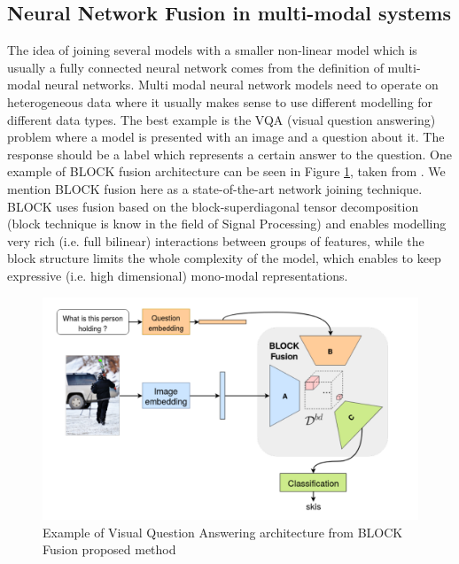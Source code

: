 \documentclass[b5paper]{book}
\let\cite\parencite
\begin{document}
\subsection{Neural Network Fusion in multi-modal systems}


The idea of joining several models with a smaller non-linear model which is usually a fully connected neural network comes from the definition of multi-modal neural networks. Multi modal neural network models need to operate on heterogeneous data where it usually makes sense to use different modelling for different data types. The best example is the VQA (visual question answering) problem where a model is presented with an image and a question about it. The response should be a label which represents a certain answer to the question. One example of BLOCK \cite{ben2019block} fusion architecture can be seen in Figure \ref{fig:block}, taken from \cite{ben2019block}. We mention BLOCK fusion here as a state-of-the-art network joining technique. BLOCK uses fusion based on the block-superdiagonal tensor decomposition  (block technique is know in the field of Signal Processing) and enables modelling very rich (i.e. full bilinear) interactions between groups of features, while the block structure
limits the whole complexity of the model, which enables to
keep expressive (i.e. high dimensional) mono-modal representations.

\begin{figure}
    \centering
    \includegraphics[scale=0.25]{figures/block.png}
    \caption{Example of Visual Question Answering architecture from BLOCK Fusion proposed method \cite{ben2019block}}
    \label{fig:block}
\end{figure}
\end{document}
